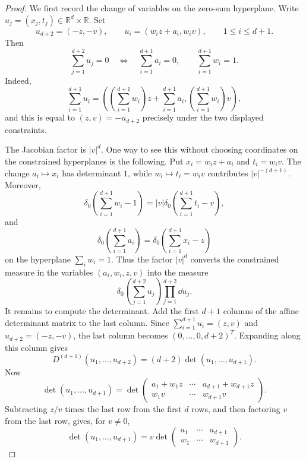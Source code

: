 \begin{proof} We first record the change of variables on the zero-sum hyperplane. Write
  $u_j = (x_j, t_j) \in \mathbb{R}^d \times \mathbb{R}$. Set
  \[ u_{d + 2} = (- z, - v), \qquad u_i = (w_i z + a_i, w_i v), \qquad 1 \leq
     i \leq d + 1. \]
  Then
  \[ \sum_{j = 1}^{d + 2} u_j = 0 \quad \Longleftrightarrow \quad \sum_{i =
     1}^{d + 1} a_i = 0, \qquad \sum_{i = 1}^{d + 1} w_i = 1. \]
  Indeed,
  \[ \sum_{i = 1}^{d + 1} u_i = \left( \left( \sum_{i = 1}^{d + 1} w_i \right)
     z + \sum_{i = 1}^{d + 1} a_i,  \left( \sum_{i = 1}^{d + 1}
     w_i \right) v \right), \]
  and this is equal to $(z, v) = - u_{d + 2}$ precisely under the two
  displayed constraints.

  The Jacobian factor is $|v|^d$. One way to see this without choosing
  coordinates on the constrained hyperplanes is the following. Put $x_i = w_i
  z + a_i$ and $t_i = w_i v$. The change $a_i \mapsto x_i$ has determinant
  $1$, while $w_i \mapsto t_i = w_i v$ contributes $|v|^{- (d + 1)}$.
  Moreover,
  \[ \delta_0  \left( \sum_{i = 1}^{d + 1} w_i - 1 \right) = |v| 
      \delta_0  \left( \sum_{i = 1}^{d + 1} t_i - v \right), \]
  and
  \[ \delta_0 \left( \sum_{i = 1}^{d + 1} a_i \right) = \delta_0  \left(
     \sum_{i = 1}^{d + 1} x_i - z \right) \]
  on the hyperplane $\sum_i w_i = 1$. Thus the factor $|v|^d$ converts the
  constrained measure in the variables $(a_i, w_i, z, v)$ into the measure
  \[ \delta_0 \left( \sum_{j = 1}^{d + 2} u_j \right)  \prod_{j = 1}^{d + 2}
     \dd u_j . \]
  It remains to compute the determinant. Add the first $d + 1$ columns of the
  affine determinant matrix to the last column. Since $\sum_{i = 1}^{d + 1}
  u_i = (z, v)$ and $u_{d + 2} = (- z, - v)$, the last column becomes $(0,
  \ldots, 0, d + 2)^T$. Expanding along this column gives
  \[ D^{(d+1)} (u_1, \ldots, u_{d + 2}) = (d + 2) \det (u_1, \ldots, u_{d +
     1}) . \]
  Now
  \[ \det (u_1, \ldots, u_{d + 1}) = \det \left( \begin{matrix}
       a_1 + w_1 z & \cdots & a_{d + 1} + w_{d + 1} z\\
       w_1 v & \cdots & w_{d + 1} v
     \end{matrix} \right) . \]
  Subtracting $z / v$ times the last row from the first $d$ rows, and then
  factoring $v$ from the last row, gives, for $v \neq 0$,
  \[ \det (u_1, \ldots, u_{d + 1}) = v \det \left( \begin{matrix}
       a_1 & \cdots & a_{d + 1}\\
       w_1 & \cdots & w_{d + 1}
     \end{matrix} \right) . \]

\end{proof}
